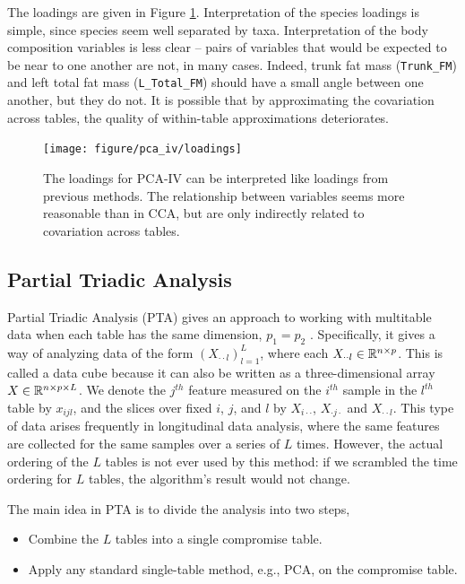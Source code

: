 \documentclass[14pt]{extarticle}
\begin{document}
The loadings are given in Figure \ref{fig:pca_iv_loadings}. Interpretation of
the species loadings is simple, since species seem well separated by taxa.
Interpretation of the body composition variables is less clear -- pairs of
variables that would be expected to be near to one another are not, in many
cases. Indeed, trunk fat mass (\texttt{Trunk\_FM}) and left total fat mass
(\texttt{L\_Total\_FM}) should have a small angle between one another, but they
do not. It is possible that by approximating the covariation across tables, the
quality of within-table approximations deteriorates.

\begin{figure}
  \centering
  \texttt{[image: figure/pca\_iv/loadings]}
  \caption{The loadings for PCA-IV can be interpreted like loadings from
    previous methods. The relationship between variables seems more reasonable
    than in CCA, but are only indirectly related to covariation across
    tables. \label{fig:pca_iv_loadings} }
\end{figure}

\subsection{Partial Triadic Analysis}
\label{subsec:partial_triadic_analysis}

Partial Triadic Analysis (PTA) gives an approach to working with multitable data
when each table has the same dimension, $p_1 = p_2$ \citep{thioulouse2011simultaneous}.
Specifically, it gives a way of analyzing data of the form $\left(X_{\cdot\cdot
  l}\right)_{l = 1}^{L}$, where each $X_{\cdot\cdot l} \in \mathbb{R}^{n \times p}$.
This is called a data cube because it can also be written as a three-dimensional
array $X \in \mathbb{R}^{n \times p \times L}$. We denote the $j^{th}$ feature
measured on the $i^{th}$ sample in the $l^{th}$ table by $x_{ijl}$, and the
slices over fixed $i$, $j$, and $l$ by $X_{i \cdot \cdot}$, $X_{\cdot j \cdot}$
and $X_{\cdot \cdot l}$. This type of data arises frequently in longitudinal
data analysis, where the same features are collected for the same samples over
a series of $L$ times. However, the actual ordering of the $L$ tables is not
ever used by this method: if we scrambled the time ordering for $L$ tables, the
algorithm's result would not change.

The main idea in PTA is to divide the analysis into two steps,
\begin{itemize}
  \item Combine the $L$ tables into a single compromise table.
  \item Apply any standard single-table method, e.g., PCA, on the
    compromise table.
\end{itemize}
\end{document}

